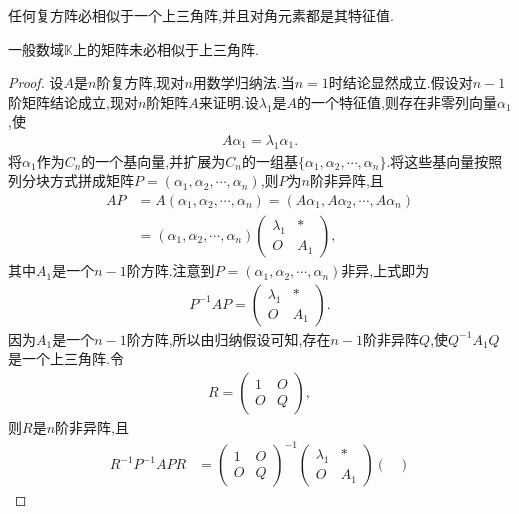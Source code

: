 \documentclass[../../main.tex]{subfiles}
\begin{document}
\begin{theorem}[复方阵必相似于上三角阵]\label{theorem:复方阵必相似于上三角阵}
任何复方阵必相似于一个上三角阵,并且对角元素都是其特征值.
\end{theorem}
\begin{remark}
一般数域$\mathbb{K}$上的矩阵未必相似于上三角阵.
\end{remark}
\begin{proof}
设$A$是$n$阶复方阵,现对$n$用数学归纳法.当$n=1$时结论显然成立.假设对$n-1$阶矩阵结论成立,现对$n$阶矩阵$A$来证明.设$\lambda_1$是$A$的一个特征值,则存在非零列向量$\alpha_1$,使
\begin{align*}
A \alpha_1 = \lambda_1 \alpha_1.
\end{align*}
将$\alpha_1$作为$C_n$的一个基向量,并扩展为$C_n$的一组基$\{\alpha_1, \alpha_2, \cdots, \alpha_n\}$.将这些基向量按照列分块方式拼成矩阵$P = (\alpha_1, \alpha_2, \cdots, \alpha_n)$,则$P$为$n$阶非异阵,且
\begin{align*}
AP &= A(\alpha_1, \alpha_2, \cdots, \alpha_n) = (A\alpha_1, A\alpha_2, \cdots, A\alpha_n) \\
&= (\alpha_1, \alpha_2, \cdots, \alpha_n) \begin{pmatrix}
\lambda_1 & * \\
O & A_1
\end{pmatrix},
\end{align*}
其中$A_1$是一个$n-1$阶方阵.注意到$P = (\alpha_1, \alpha_2, \cdots, \alpha_n)$非异,上式即为
\begin{align*}
P^{-1}AP = \begin{pmatrix}
\lambda_1 & * \\
O & A_1
\end{pmatrix}.
\end{align*}
因为$A_1$是一个$n-1$阶方阵,所以由归纳假设可知,存在$n-1$阶非异阵$Q$,使$Q^{-1}A_1Q$是一个上三角阵.令
\begin{align*}
R = \begin{pmatrix}
1 & O \\
O & Q
\end{pmatrix},
\end{align*}
则$R$是$n$阶非异阵,且
\begin{align*}
R^{-1}P^{-1}APR &= \begin{pmatrix}
1 & O \\
O & Q
\end{pmatrix}^{-1} \begin{pmatrix}
\lambda_1 & * \\
O & A_1
\end{pmatrix} \begin{pmatrix}

\end{pmatrix}
\end{align*}
\end{proof}
\end{document}
